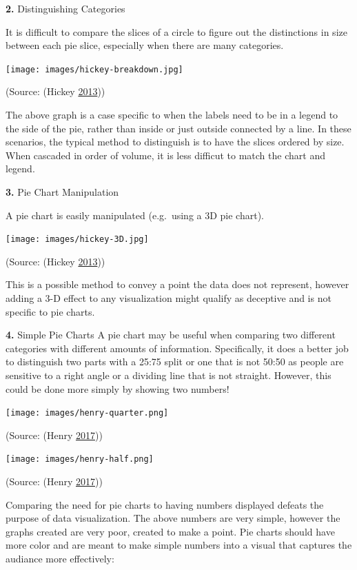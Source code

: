 \documentclass[]{book}
\begin{document}
\textbf{2.} Distinguishing Categories

It is difficult to compare the slices of a circle to figure out the distinctions in size between each pie slice, especially when there are many categories.

\texttt{[image: images/hickey-breakdown.jpg]}

(Source: (Hickey \protect\hyperlink{ref-hickey-pie-worst}{2013}))

The above graph is a case specific to when the labels need to be in a legend to the side of the pie, rather than inside or just outside connected by a line. In these scenarios, the typical method to distinguish is to have the slices ordered by size. When cascaded in order of volume, it is less difficut to match the chart and legend.

\textbf{3.} Pie Chart Manipulation

A pie chart is easily manipulated (e.g.~using a 3D pie chart).

\texttt{[image: images/hickey-3D.jpg]}

(Source: (Hickey \protect\hyperlink{ref-hickey-pie-worst}{2013}))

This is a possible method to convey a point the data does not represent, however adding a 3-D effect to any visualization might qualify as deceptive and is not specific to pie charts.

\textbf{4.} Simple Pie Charts
A pie chart may be useful when comparing two different categories with different amounts of information. Specifically, it does a better job to distinguish two parts with a 25:75 split or one that is not 50:50 as people are sensitive to a right angle or a dividing line that is not straight. However, this could be done more simply by showing two numbers!

\texttt{[image: images/henry-quarter.png]}

(Source: (Henry \protect\hyperlink{ref-henry-defense-pie}{2017}))

\texttt{[image: images/henry-half.png]}

(Source: (Henry \protect\hyperlink{ref-henry-defense-pie}{2017}))

Comparing the need for pie charts to having numbers displayed defeats the purpose of data visualization. The above numbers are very simple, however the graphs created are very poor, created to make a point. Pie charts should have more color and are meant to make simple numbers into a visual that captures the audiance more effectively:
\end{document}
